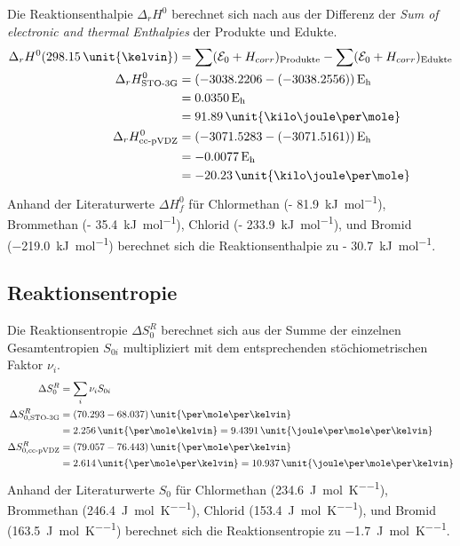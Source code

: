 Die Reaktionsenthalpie $\Delta_r H^0$ berechnet sich nach \cite{gaussian-thermochem} aus der Differenz der \textit{Sum of electronic and thermal Enthalpies} der Produkte und Edukte.
\begin{align*}
              \Delta_r H^0(298.15\, \text{\unit{\kelvin}}) &= \sum (\mathcal{E}_0 + H_{corr})_{\text{Produkte}} - \sum (\mathcal{E}_0 + H_{corr})_{\text{Edukte}} \\
     \Delta_r H^0_{\text{STO-3G}} &= (- 3038.2206 - (- 3038.2556))\, \text{E\textsubscript{h}} \\
                           &=  0.0350\, \text{E\textsubscript{h}} \\
                           &= 91.89\, \text{\unit{\kilo\joule\per\mole}} \\
    \Delta_r H^0_{\text{cc-pVDZ}} &= (- 3071.5283 - (- 3071.5161))\, \text{E\textsubscript{h}} \\
                           &= - 0.0077\, \text{E\textsubscript{h}} \\
                           &= - 20.23\, \text{\unit{\kilo\joule\per\mole}}
\end{align*}
Anhand der Literaturwerte $\Delta H_f^0$ für Chlormethan (\qty{- 81.9}{\kilo\joule\per\mole})\autocite{crc:std-thermo:ch3cl+ch3br}, Brommethan (\qty{- 35.4}{\kilo\joule\per\mole})\autocite{crc:std-thermo:ch3cl+ch3br},
Chlorid (\qty{- 233.9}{\kilo\joule\per\mole})\autocite{nist-thermochem}, und Bromid (\qty{-219.0}{\kilo\joule\per\mole})\autocite{nist-thermochem}
berechnet sich die Reaktionsenthalpie zu \qty{- 30.7}{\kilo\joule\per\mole}.

\subsection{Reaktionsentropie}

Die Reaktionsentropie $\Delta S_0^R$ berechnet sich aus der Summe der einzelnen Gesamtentropien $S_{0i}$ multipliziert mit dem entsprechenden stöchiometrischen Faktor $\nu_i$.
\begin{align*}
              \Delta S_0^R &= \sum_i \nu_i S_{0i} \\
    \Delta S_{0, \text{STO-3G}}^R &= (70.293 - 68.037) \, \text{\unit{\cal\per\mole\per\kelvin}} \\
                           &= 2.256 \, \text{\unit{\cal\per\mole\kelvin}} = 9.4391 \, \text{\unit{\joule\per\mole\per\kelvin}} \\
   \Delta S_{0, \text{cc-pVDZ}}^R &= (79.057 - 76.443) \, \text{\unit{\cal\per\mole\per\kelvin}} \\
                           &= 2.614 \, \text{\unit{\cal\per\mole\per\kelvin}} = 10.937 \, \text{\unit{\joule\per\mole\per\kelvin}}
\end{align*}
Anhand der Literaturwerte $S_0$ für Chlormethan (\qty{234.6}{\joule\per\mole\per\kelvin})\autocite{crc:std-thermo:ch3cl+ch3br}, Brommethan (\qty{246.4}{\joule\per\mole\per\kelvin})\autocite{crc:std-thermo:ch3cl+ch3br},
Chlorid (\qty{153.4}{\joule\per\mole\per\kelvin})\autocite{nist-thermochem}, und Bromid (\qty{163.5}{\joule\per\mole\per\kelvin})\autocite{nist-thermochem}
berechnet sich die Reaktionsentropie zu \qty{-1.7}{\joule\per\mole\per\kelvin}.

